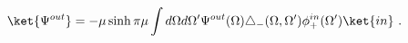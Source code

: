 \begin{equation}
\ket{\Psi^{out}}=-\mu\sinh\pi\mu
\int d\Omega d\Omega'
 \Psi^{out}(\Omega)\triangle_-(\Omega,\Omega')
\phi^{in}_+(\Omega')\ket{in} \ .
\end{equation}

